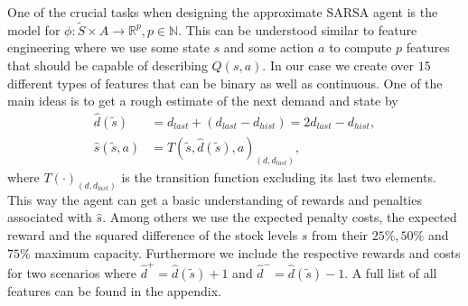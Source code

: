 \documentclass[journal, a4paper]{IEEEtran}
\theoremstyle{plain}
\theoremstyle{definition}
\begin{document}
One of the crucial tasks when designing the approximate SARSA agent is the model for $\phi: \tilde{S} \times A \rightarrow \mathbb{R}^p, p \in \mathbb{N}$. This can be understood similar to feature engineering where we use some state $s$ and some action $a$ to compute $p$ features that should be capable of describing $Q(s,a)$. In our case we create over $15$ different types of features that can be binary as well as continuous. One of the main ideas is to get a rough estimate of the next demand and state by
\begin{equation}
	\begin{split}
		\hat{d}(\tilde{s})&= d_{last} + \left( d_{last} - d_{hist} \right) = 2d_{last} - d_{hist}, \\
		\hat{s}(\tilde{s}, a) &= T(\tilde{s}, \hat{d}(\tilde{s}), a)_{(d, d_{last})},
	\end{split}
\end{equation}
where $T(\cdot)_{(d, d_{last})}$ is the transition function excluding its last two elements. This way the agent can get a basic understanding of rewards and penalties associated with $\hat{s}$. Among others we use the expected penalty costs, the expected reward and the squared difference of the stock levels $s$ from their $25\%, 50\%$ and $75\% $ maximum capacity. Furthermore we include the respective rewards and costs for two scenarios where $\hat{d}^+=\hat{d}(\tilde{s}) + 1$ and $\hat{d}^-=\hat{d}(\tilde{s})  - 1$. %
A full list of all features can be found in the appendix. \newline
\end{document}
